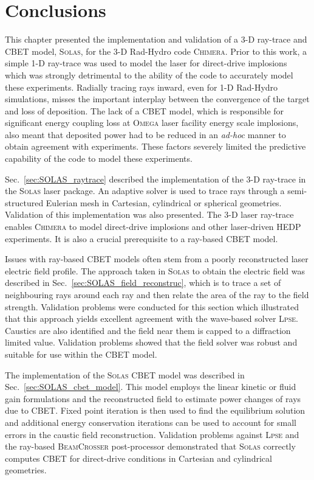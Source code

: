 \section{Conclusions}

This chapter presented the implementation and validation of a 3-D ray-trace and \ac{CBET} model, \textsc{Solas}, for the 3-D \ac{Rad-Hydro} code \textsc{Chimera}.
Prior to this work, a simple 1-D ray-trace was used to model the laser for direct-drive implosions which was strongly detrimental to the ability of the code to accurately model these experiments.
Radially tracing rays inward, even for 1-D \ac{Rad-Hydro} simulations, misses the important interplay between the convergence of the target and loss of deposition.
The lack of a \ac{CBET} model, which is responsible for significant energy coupling loss at \textsc{Omega} laser facility energy scale implosions, also meant that deposited power had to be reduced in an \textit{ad-hoc} manner to obtain agreement with experiments.
These factors severely limited the predictive capability of the code to model these experiments.

Sec.~\ref{sec:SOLAS_raytrace} described the implementation of the 3-D ray-trace in the \textsc{Solas} laser package.
An adaptive solver is used to trace rays through a semi-structured Eulerian mesh in Cartesian, cylindrical or spherical geometries. 
Validation of this implementation was also presented.
The 3-D laser ray-trace enables \textsc{Chimera} to model direct-drive implosions and other laser-driven \ac{HEDP} experiments.
It is also a crucial prerequisite to a ray-based \ac{CBET} model.

Issues with ray-based \ac{CBET} models often stem from a poorly reconstructed laser electric field profile.
The approach taken in \textsc{Solas} to obtain the electric field was described in Sec.~\ref{sec:SOLAS_field_reconstruc}, which is to trace a set of neighbouring rays around each ray and then relate the area of the ray to the field strength.
Validation problems were conducted for this section which illustrated that this approach yields excellent agreement with the wave-based solver \textsc{Lpse}.
Caustics are also identified and the field near them is capped to a diffraction limited value.
Validation problems showed that the field solver was robust and suitable for use within the \ac{CBET} model.

The implementation of the \textsc{Solas} \ac{CBET} model was described in Sec.~\ref{sec:SOLAS_cbet_model}.
This model employs the linear kinetic or fluid gain formulations and the reconstructed field to estimate power changes of rays due to \ac{CBET}.
Fixed point iteration is then used to find the equilibrium solution and additional energy conservation iterations can be used to account for small errors in the caustic field reconstruction.
Validation problems against \textsc{Lpse} and the ray-based \textsc{BeamCrosser} post-processor demonstrated that \textsc{Solas} correctly computes \ac{CBET} for direct-drive conditions in Cartesian and cylindrical geometries.

